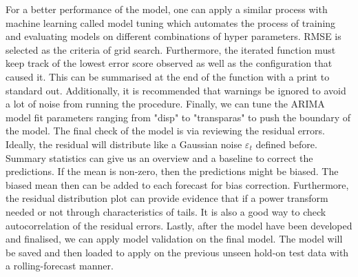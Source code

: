 \indent For a better performance of the model, one can apply a similar process with machine learning called model tuning which automates the process of training and evaluating models on different combinations of hyper parameters. RMSE is selected as the criteria of grid search. Furthermore, the iterated function must keep track of the lowest error score observed as well as the configuration that caused it. This can be summarised at the end of the function with a print to standard out. Additionally, it is recommended that warnings be ignored to avoid a lot of noise from running the procedure. Finally, we can tune the ARIMA model fit parameters ranging from "disp" to "transparas" to push the boundary of the model. The final check of the model is via reviewing the residual errors. Ideally, the residual will distribute like a Gaussian noise $\varepsilon_t$ defined before. Summary statistics can give us an overview and a baseline to correct the predictions. If the mean is non-zero, then the predictions might be biased. The biased mean then can be added to each forecast for bias correction. Furthermore, the residual distribution plot can provide evidence that if a power transform needed or not through characteristics of tails. It is also a good way to check autocorrelation of the residual errors. Lastly, after the model have been developed and finalised, we can apply model validation on the final model. The model will be saved and then loaded to apply on the previous unseen hold-on test data with a rolling-forecast manner. 

